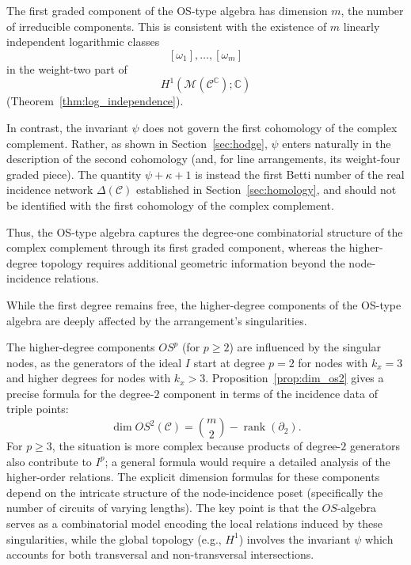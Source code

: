 \documentclass[article,11pt]{amsart} \numberwithin{equation}{section}
\numberwithin{equation}{section}
\begin{document}
{\begin{rk}
	The first graded component of the OS-type algebra has dimension $m$, the number of irreducible components. This is consistent with the existence of $m$ linearly independent logarithmic classes
	\[
	[\omega_1], \dots, [\omega_m]
	\]
	in the weight-two part of
	\[
	H^1(\mathcal{M}(\mathcal{C}^{\mathbb{C}});\mathbb{C})
	\]
	(Theorem~\ref{thm:log_independence}).
	
	In contrast, the invariant $\psi$ does not govern the first cohomology of the complex complement. Rather, as shown in Section~\ref{sec:hodge}, $\psi$ enters naturally in the description of the second cohomology (and, for line arrangements, its weight-four graded piece). The quantity $\psi+\kappa+1$ is instead the first Betti number of the real incidence network $\Delta(\mathcal{C})$ established in Section~\ref{sec:homology}, and should not be identified with the first cohomology of the complex complement.
	
	Thus, the OS-type algebra captures the degree-one combinatorial structure of the complex complement through its first graded component, whereas the higher-degree topology requires additional geometric information beyond the node-incidence relations.
\end{rk}

While the first degree remains free, the higher-degree components of the OS-type algebra are deeply affected by the arrangement's singularities. 


\begin{rk}
	\label{rmk:higher_degree_influence}
	The higher-degree components $OS^p$ (for $p \ge 2$) are influenced by the singular nodes, as the generators of the ideal $I$ start at degree $p=2$ for nodes with $k_x=3$ and higher degrees for nodes with $k_x > 3$. Proposition~\ref{prop:dim_os2} gives a precise formula for the degree-$2$ component in terms of the incidence data of triple points:
	\[
	\dim OS^2(\mathcal C)=\binom{m}{2}-\operatorname{rank}(\partial_2).
	\]
	For $p\ge 3$, the situation is more complex because products of degree-$2$ generators also contribute to $I^p$; a general formula would require a detailed analysis of the higher-order relations. The explicit dimension formulas for these components depend on the intricate structure of the node-incidence poset (specifically the number of circuits of varying lengths). The key point is that the $OS$-algebra serves as a combinatorial model encoding the local relations induced by these singularities, while the global topology (e.g., $H^1$) involves the invariant $\psi$ which accounts for both transversal and non-transversal intersections.
\end{rk}

}
\end{document}
